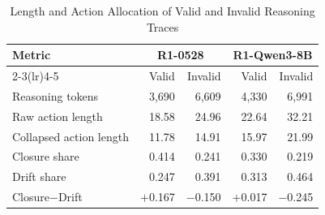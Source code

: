 \begin{table}[t]
\centering
\caption{Length and Action Allocation of Valid and Invalid Reasoning Traces}
\label{tab:rq2-trace-stats}
\footnotesize
\setlength{\tabcolsep}{6pt}
\renewcommand{\arraystretch}{1.05}
\begin{tabular}{l rr rr}
\toprule
\multirow{2}{*}{Metric} & \multicolumn{2}{c}{R1-0528} & \multicolumn{2}{c}{R1-Qwen3-8B} \\
\cmidrule(lr){2-3}\cmidrule(lr){4-5}
 & Valid & Invalid & Valid & Invalid \\
\midrule
Reasoning tokens & 3{,}690 & 6{,}609 & 4{,}330 & 6{,}991 \\
Raw action length & 18.58 & 24.96 & 22.64 & 32.21 \\
Collapsed action length & 11.78 & 14.91 & 15.97 & 21.99 \\
\midrule
Closure share & 0.414 & 0.241 & 0.330 & 0.219 \\
Drift share & 0.247 & 0.391 & 0.313 & 0.464 \\
Closure$-$Drift & $+$0.167 & $-$0.150 & $+$0.017 & $-$0.245 \\
\bottomrule
\end{tabular}
\end{table}

